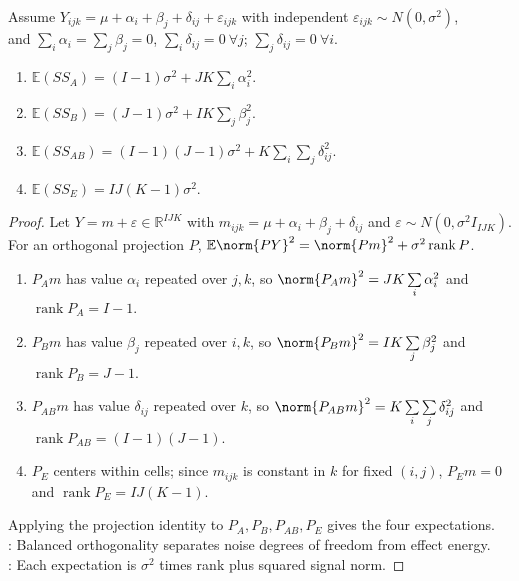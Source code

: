 \begin{theorem} \label{thm:two-way-anova-expected-sums-of-squares} \\
Assume $Y_{ijk}=\mu+\alpha_i+\beta_j+\delta_{ij}+\varepsilon_{ijk}$ with independent $\varepsilon_{ijk}\sim N(0,\sigma^2)$,\\
and $\sum\limits_i\alpha_i=\sum\limits_j\beta_j=0$, $\sum\limits_i\delta_{ij}=0\ \forall j$; $\sum\limits_j\delta_{ij}=0\ \forall i$.
\begin{enumerate}[label=(\roman*)]
\setlength{\itemsep}{0pt}
\item $\mathbb{E}(SS_A)=(I-1)\sigma^2+JK\sum\limits_i\alpha_i^2$.
\item $\mathbb{E}(SS_B)=(J-1)\sigma^2+IK\sum\limits_j\beta_j^2$.
\item $\mathbb{E}(SS_{AB})=(I-1)(J-1)\sigma^2+K\sum\limits_i\sum\limits_j\delta_{ij}^2$.
\item $\mathbb{E}(SS_E)=IJ(K-1)\sigma^2$.
\end{enumerate}
\begin{proof} Let $Y=m+\varepsilon\in\mathbb{R}^{IJK}$ with $m_{ijk}=\mu+\alpha_i+\beta_j+\delta_{ij}$ and $\varepsilon\sim N(0,\sigma^2 I_{IJK})$.\\
For an orthogonal projection $P$, $\mathbb{E}\norm{PY}^2=\norm{Pm}^2+\sigma^2\operatorname{rank}P$.
\begin{enumerate}[label=(\roman*)]
\setlength{\itemsep}{0pt}
\item $P_A m$ has value $\alpha_i$ repeated over $j,k$, so $\norm{P_A m}^2=JK\sum\limits_i\alpha_i^2$ and $\operatorname{rank}P_A=I-1$.
\item $P_B m$ has value $\beta_j$ repeated over $i,k$, so $\norm{P_B m}^2=IK\sum\limits_j\beta_j^2$ and $\operatorname{rank}P_B=J-1$.
\item $P_{AB}m$ has value $\delta_{ij}$ repeated over $k$, so $\norm{P_{AB}m}^2=K\sum\limits_i\sum\limits_j\delta_{ij}^2$ and $\operatorname{rank}P_{AB}=(I-1)(J-1)$.
\item $P_E$ centers within cells; since $m_{ijk}$ is constant in $k$ for fixed $(i,j)$, $P_E m=0$ and $\operatorname{rank}P_E=IJ(K-1)$.
\end{enumerate}
Applying the projection identity to $P_A,P_B,P_{AB},P_E$ gives the four expectations.\\
: Balanced orthogonality separates noise degrees of freedom from effect energy.\\
: Each expectation is $\sigma^2$ times rank plus squared signal norm.
\end{proof}
\end{theorem}

